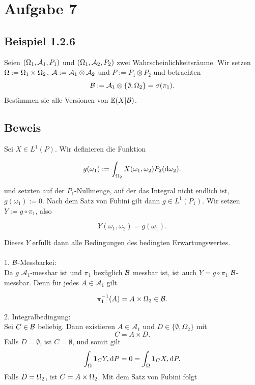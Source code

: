 \documentclass[12pt]{scrartcl}
\begin{document}
\ausruecken

\section*{Aufgabe 7}
\subsection*{Beispiel 1.2.6}
\einruecken

Seien $(\Omega_1, \mathcal{A}_1, P_1)$ und $(\Omega_1, \mathcal{A}_2, P_2)$ zwei Wahrscheinlichkeitsräume. Wir setzen $\Omega := \Omega_1 \times \Omega_2$, $\mathcal{A} := \mathcal{A}_1\otimes\mathcal{A}_2$ und $P := P_1 \otimes P_2$
und betrachten
$$\mathcal{B} := \mathcal{A}_1\otimes\{\emptyset,\Omega_2\}=\sigma(\pi_1).$$
Bestimmen sie alle Versionen von $\mathbb{E}(X|\mathcal{B})$. %

\ausruecken

\subsection*{Beweis}
\einruecken

Sei $X\in L^1(P)$. Wir definieren die Funktion

$$g(\omega_1):=\int_{\Omega_2}X(\omega_1,\omega_2)P_2(\mathop{}\!\mathrm{d} \omega_2).$$

und setzten auf der $P_1$-Nullmenge, auf der das Integral nicht endlich ist, $g(\omega_1):=0$. Nach dem Satz von Fubini gilt dann $g\in L^1(P_1)$.
Wir setzen $Y:=g\circ\pi_1$, also

$$Y(\omega_1,\omega_2)=g(\omega_1).$$

Dieses $Y$ erfüllt dann alle Bedingungen des bedingten Erwartungswertes.\\
\\
1. $\mathcal{B}$-Messbarkei:\\
Da $g$ $\mathcal A_1$-messbar ist und $\pi_1$ bezüglich $\mathcal{B}$ messbar ist, ist auch $Y=g\circ\pi_1$ $\mathcal{B}$-messbar. Denn für jedes $A\in\mathcal A_1$ gilt

$$ \pi_1^{-1}(A)=A\times\Omega_2\in \mathcal{B}. $$

2. Integralbedingung:\\
Sei $C\in \mathcal{B}$ beliebig. Dann existieren $A\in\mathcal A_1$ und $D\in\{\emptyset,\Omega_2\}$ mit
$$
C=A\times D.
$$
Falls $D=\emptyset$, ist $C=\emptyset$, und somit gilt
$$
\int_{\Omega} \mathbf 1_CY,\mathop{}\!\mathrm{d} P
=0
=\int_{\Omega} \mathbf 1_CX,\mathop{}\!\mathrm{d} P.
$$
Falls $D=\Omega_2$, ist $C=A\times\Omega_2$. Mit dem Satz von Fubini folgt
\end{document}
